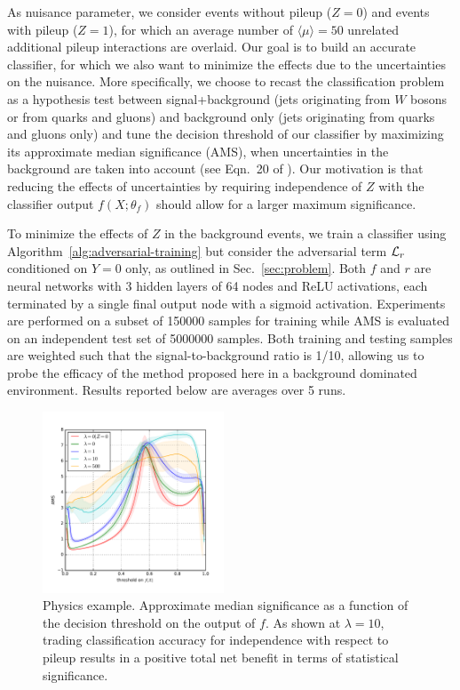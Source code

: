 \documentclass[twocolumn,superscriptaddress,aps]{revtex4-1}
\theoremstyle{plain}
\begin{document}
As nuisance parameter, we consider events without pileup ($Z=0$) and
events with pileup ($Z=1$), for which an average number of $\langle \mu \rangle =
50$ unrelated additional pileup interactions are overlaid. Our goal is to build an accurate
classifier, for which we also want to minimize the effects due to the
uncertainties on the nuisance. More specifically, we choose to recast the
classification problem as a hypothesis test between signal+background (jets
originating from $W$ bosons or from quarks and gluons) and background
only (jets originating from quarks and gluons only) and tune the decision
threshold of our classifier by maximizing its approximate median significance
(AMS), when uncertainties in the background are taken into account (see Eqn.~20
of \citep{adam2014higgs}). Our motivation is that reducing the effects of
uncertainties by requiring independence of $Z$ with the classifier output $f(X;\theta_f)$ should
allow for a larger maximum significance.

To minimize the effects of $Z$ in the background events, we train a classifier
using  Algorithm~\ref{alg:adversarial-training} but consider the adversarial
term ${\cal L}_r$ conditioned on $Y=0$ only, as outlined in
Sec.~\ref{sec:problem}. Both $f$ and $r$ are neural networks with 3 hidden
layers of 64 nodes and ReLU activations, each terminated by a single final
output node with a sigmoid activation. Experiments are performed on a subset of
150000 samples for training while AMS is evaluated on an independent test set of
5000000 samples. Both training and testing samples are weighted such that the
signal-to-background ratio is 1/10, allowing us to probe the efficacy of the
method proposed here in a background dominated environment. Results reported
below are averages over 5 runs.

\begin{figure}
    \includegraphics[width=0.48\textwidth]{figures/ams.pdf}
    \caption{Physics example. Approximate median significance as a function of the decision threshold
             on the output of $f$.  As shown at $\lambda=10$, trading
             classification accuracy for independence with respect to pileup
             results in a positive total net benefit in terms of statistical significance.}
    \label{fig:physics-ams}
\end{figure}
\end{document}
